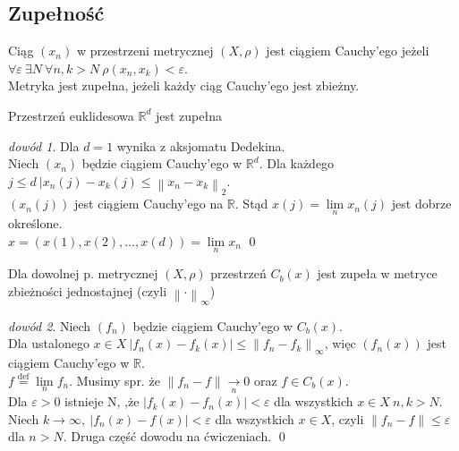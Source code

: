 \documentclass[twoside,10pt]{article}
\newcommand{\norm}[1]{\left\lVert#1\right\rVert}
\theoremstyle{definition}
\theoremstyle{definition}
\theoremstyle{definition}
\theoremstyle{definition}
\theoremstyle{remark}
\newtheorem*{dd}{dowód}
\theoremstyle{definition}
\theoremstyle{definition}
\theoremstyle{definition}
\theoremstyle{definition}
\theoremstyle{definition}
\theoremstyle{definition}
\begin{document}
\subsection{Zupełność} 
\begin{df} Ciąg $(x_n)$ w przestrzeni metrycznej $(X,\rho)$ jest ciągiem Cauchy'ego jeżeli $\forall \varepsilon \ \exists N \ 
    \forall n, k > N \ \rho(x_n,x_k) < \varepsilon$. \\ 
    Metryka jest zupełna, jeżeli każdy ciąg Cauchy'ego jest zbieżny. \end{df} 
\begin{tw} Przestrzeń euklidesowa $\mathbb{R}^d$ jest zupełna \end{tw} 
\begin{dd} 
    Dla $d=1$ wynika z aksjomatu Dedekina. \\
    Niech $(x_n)$ będzie ciągiem Cauchy'ego w $\mathbb{R}^d$. Dla każdego $ j \le d \ |x_n(j)-x_k(j) \le \norm{x_n - x_k}_2$. \\
    $(x_n(j))$ jest ciągiem Cauchy'ego na $\mathbb{R}$. Stąd $x(j) = \lim\limits_n x_n(j)$ jest dobrze określone. \\
    $x = (x(1),x(2),\ldots,x(d)) = \lim\limits_n x_n$ \hfill \qed
\end{dd} 
\begin{tw} Dla dowolnej p. metrycznej $(X,\rho)$ przestrzeń $C_b(x)$ jest zupeła w metryce zbieżności jednostajnej (czyli $\norm{\cdot}_\infty$) \end{tw} 
\begin{dd} Niech $(f_n)$ będzie ciągiem Cauchy'ego w $C_b(x)$. \\ 
    Dla ustalonego $x \in X \ |f_n(x) - f_k(x)| \le \norm{f_n-f_k}_\infty$, więc $(f_n(x))$ jest ciągiem Cauchy'ego w $\mathbb{R}$. \\ 
    $f  \overset{\text{def}}{=} \lim\limits_n f_n$. Musimy spr. że $\norm{f_n-f} \underset{n}{\rightarrow} 0$ oraz $f \in C_b(x)$. \\
    Dla $\varepsilon > 0$ istnieje N, ,że $|f_k(x) - f_n(x)| < \varepsilon$ dla wszystkich $x \in X \ n,k > N$.
    Niech $k \rightarrow \infty, \ |f_n(x)-f(x)| < \varepsilon$ dla wszystkich $x \in X$, czyli $\norm{f_n-f} \le \varepsilon$ dla $n > N$.
    Druga część dowodu na ćwiczeniach. \hfill \qed
\end{dd}
\end{document}
